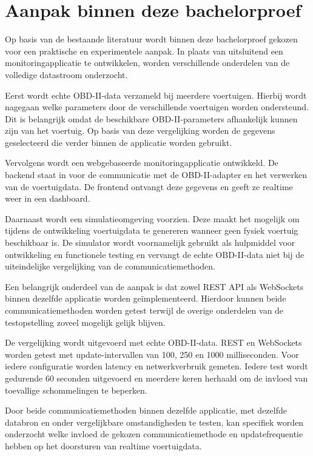 \section{Aanpak binnen deze bachelorproef}
Op basis van de bestaande literatuur wordt binnen deze bachelorproef gekozen
voor een praktische en experimentele aanpak. In plaats van uitsluitend een
monitoringapplicatie te ontwikkelen, worden verschillende onderdelen van de
volledige datastroom onderzocht.

Eerst wordt echte OBD-II-data verzameld bij meerdere voertuigen. Hierbij wordt
nagegaan welke parameters door de verschillende voertuigen worden ondersteund.
Dit is belangrijk omdat de beschikbare OBD-II-parameters afhankelijk kunnen
zijn van het voertuig. Op basis van deze vergelijking worden de gegevens
geselecteerd die verder binnen de applicatie worden gebruikt.

Vervolgens wordt een webgebaseerde monitoringapplicatie ontwikkeld. De
backend staat in voor de communicatie met de OBD-II-adapter en het verwerken
van de voertuigdata. De frontend ontvangt deze gegevens en geeft ze realtime
weer in een dashboard.

Daarnaast wordt een simulatieomgeving voorzien. Deze maakt het mogelijk om
tijdens de ontwikkeling voertuigdata te genereren wanneer geen fysiek voertuig
beschikbaar is. De simulator wordt voornamelijk gebruikt als hulpmiddel voor
ontwikkeling en functionele testing en vervangt de echte OBD-II-data niet bij
de uiteindelijke vergelijking van de communicatiemethoden.

Een belangrijk onderdeel van de aanpak is dat zowel REST API als WebSockets
binnen dezelfde applicatie worden geïmplementeerd. Hierdoor kunnen beide
communicatiemethoden worden getest terwijl de overige onderdelen van de
testopstelling zoveel mogelijk gelijk blijven.

De vergelijking wordt uitgevoerd met echte OBD-II-data. REST en WebSockets
worden getest met update-intervallen van 100, 250 en 1000 milliseconden. Voor
iedere configuratie worden latency en netwerkverbruik gemeten. Iedere test
wordt gedurende 60 seconden uitgevoerd en meerdere keren herhaald om de invloed
van toevallige schommelingen te beperken.

Door beide communicatiemethoden binnen dezelfde applicatie, met dezelfde
databron en onder vergelijkbare omstandigheden te testen, kan specifiek worden
onderzocht welke invloed de gekozen communicatiemethode en updatefrequentie
hebben op het doorsturen van realtime voertuigdata.

